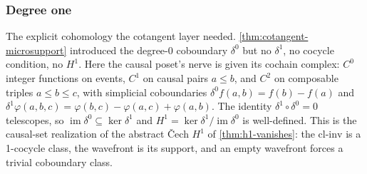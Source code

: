 \subsubsection{Degree one}

\begin{theorem}\label{thm:causal-cochain-complex}\leanok{}
The explicit cohomology the cotangent layer needed.
\cref{thm:cotangent-microsupport} introduced the degree-0 coboundary
$\delta^0$ but no $\delta^1$, no cocycle condition, no $H^1$. Here the causal
poset's nerve is given its cochain complex: $C^0$ integer functions on events,
$C^1$ on causal pairs $a \leq b$, and $C^2$ on composable triples
$a \leq b \leq c$, with simplicial coboundaries
$\delta^0 f(a,b) = f(b) - f(a)$ and
$\delta^1 \varphi(a,b,c) = \varphi(b,c) - \varphi(a,c) + \varphi(a,b)$.
The identity $\delta^1 \circ \delta^0 = 0$ telescopes, so
$\operatorname{im}\delta^0 \subseteq \ker\delta^1$ and
$H^1 = \ker\delta^1 / \operatorname{im}\delta^0$ is well-defined. This is the
causal-set realization of the abstract \v{C}ech $H^1$ of
\cref{thm:h1-vanishes}: the $\mathrm{cl\text{-}inv}$ is a 1-cocycle class,
the wavefront is its support, and an empty wavefront forces a trivial
coboundary class.
\end{theorem}
